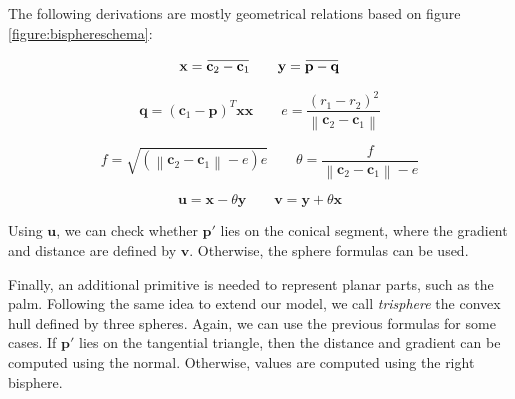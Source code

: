 \documentclass[a4paper,10pt]{article}
\newcommand{\overbar}[1]{\mkern 1.5mu\overline{\mkern-1.5mu#1\mkern-1.5mu}\mkern 1.5mu}
\begin{document}
\begin{multicols}{2}
The following derivations are mostly geometrical relations based on figure \ref{figure:bisphereschema}:

\begin{equation*}
\mathbf{x} = \overbar{\mathbf{c}_2 - \mathbf{c}_1}
\qquad
\mathbf{y} = \overbar{\mathbf{p} - \mathbf{q}}
\end{equation*}

\begin{equation*}
\mathbf{q} = \left( \mathbf{c}_1 - \mathbf{p} \right)^T \mathbf{x} \mathbf{x}
\qquad
e = \frac{\left( r_1 - r_2 \right)^2}{\left\| \mathbf{c}_2 - \mathbf{c}_1 \right\|}
\end{equation*}

\begin{equation*}
f = \sqrt{\left(\left\| \mathbf{c}_2 - \mathbf{c}_1 \right\| - e \right) e}
\qquad
\theta = \frac{f}{\left\| \mathbf{c}_2 - \mathbf{c}_1 \right\| - e}
\end{equation*}

\begin{equation*}
\mathbf{u} = \mathbf{x} - \theta \mathbf{y}
\qquad
\mathbf{v} = \mathbf{y} + \theta \mathbf{x}
\end{equation*}

Using $\mathbf{u}$, we can check whether $\mathbf{p}'$ lies on the conical segment, where the gradient and distance are defined by $\mathbf{v}$.
Otherwise, the sphere formulas can be used.

Finally, an additional primitive is needed to represent planar parts, such as the palm.
Following the same idea to extend our model, we call \emph{trisphere} the convex hull defined by three spheres.
Again, we can use the previous formulas for some cases.
If $\mathbf{p}'$ lies on the tangential triangle, then the distance and gradient can be computed using the normal.
Otherwise, values are computed using the right bisphere.


\end{multicols}
\end{document}
